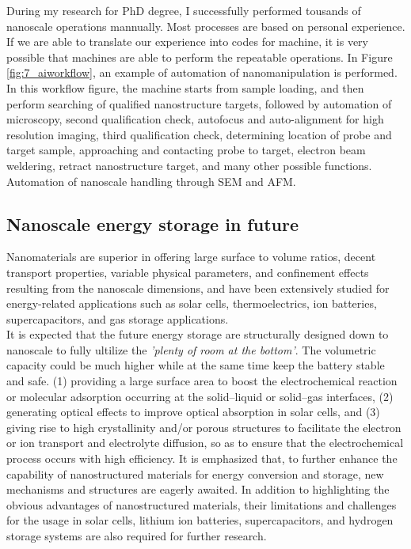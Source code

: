 During my research for PhD degree, I successfully performed tousands of nanoscale operations mannually. Most processes are based on personal experience. If we are able to translate our experience into codes for machine, it is very possible that machines are able to perform the repeatable operations. In Figure \ref{fig:7_aiworkflow}, an example of automation of nanomanipulation is performed. In this workflow figure, the machine starts from sample loading, and then perform searching of qualified nanostructure targets, followed by automation of microscopy, second qualification check, autofocus and auto-alignment for high resolution imaging, third qualification check, determining location of probe and target sample, approaching and contacting probe to target, electron beam weldering, retract nanostructure target, and many other possible functions. 
Automation of nanoscale handling through SEM and AFM. \cite{Sergej Fatikow}

\subsection{Nanoscale energy storage in future}
Nanomaterials are superior in offering large surface to volume ratios, decent transport properties, variable physical parameters, and confinement effects resulting from the nanoscale dimensions, and have been extensively studied for energy-related applications such as solar cells, thermoelectrics, ion batteries, supercapacitors, and gas storage applications.\\
It is expected that the future energy storage are structurally designed down to nanoscale to fully ultilize the {\em 'plenty of room at the bottom'}. The volumetric capacity could be much higher while at the same time keep the battery stable and safe. 
(1) providing a large surface area to boost the electrochemical reaction or molecular adsorption occurring at the solid–liquid or solid–gas interfaces, (2) generating optical effects to improve optical absorption in solar cells, and (3) giving rise to high crystallinity and/or porous structures to facilitate the electron or ion transport and electrolyte diffusion, so as to ensure that the electrochemical process occurs with high efficiency. It is emphasized that, to further enhance the capability of nanostructured materials for energy conversion and storage, new mechanisms and structures are eagerly awaited. In addition to highlighting the obvious advantages of nanostructured materials, their limitations and challenges for the usage in solar cells, lithium ion batteries, supercapacitors, and hydrogen storage systems are also required for further research.\cite{qifengzhang2013csr}\\




